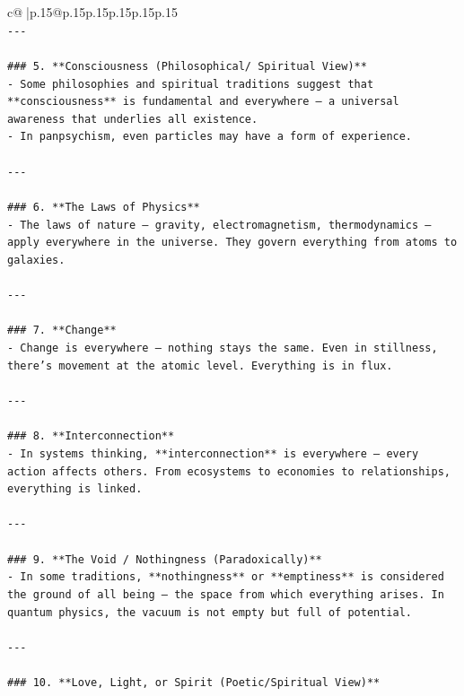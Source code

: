 \documentclass{article}
\begin{document}
{\begin{supertabular}{c@{$\;$}|p{.15\linewidth}@{}p{.15\linewidth}p{.15\linewidth}p{.15\linewidth}p{.15\linewidth}p{.15\linewidth}}
{{{\\ 
\texttt{{-}{-}{-}} \\
\\ 
\texttt{\#\#\# 5. **Consciousness (Philosophical/ Spiritual View)**} \\
\texttt{{-} Some philosophies and spiritual traditions suggest that **consciousness** is fundamental and everywhere — a universal awareness that underlies all existence.} \\
\texttt{{-} In panpsychism, even particles may have a form of experience.} \\
\\ 
\texttt{{-}{-}{-}} \\
\\ 
\texttt{\#\#\# 6. **The Laws of Physics**} \\
\texttt{{-} The laws of nature — gravity, electromagnetism, thermodynamics — apply everywhere in the universe. They govern everything from atoms to galaxies.} \\
\\ 
\texttt{{-}{-}{-}} \\
\\ 
\texttt{\#\#\# 7. **Change**} \\
\texttt{{-} Change is everywhere — nothing stays the same. Even in stillness, there’s movement at the atomic level. Everything is in flux.} \\
\\ 
\texttt{{-}{-}{-}} \\
\\ 
\texttt{\#\#\# 8. **Interconnection**} \\
\texttt{{-} In systems thinking, **interconnection** is everywhere — every action affects others. From ecosystems to economies to relationships, everything is linked.} \\
\\ 
\texttt{{-}{-}{-}} \\
\\ 
\texttt{\#\#\# 9. **The Void / Nothingness (Paradoxically)**} \\
\texttt{{-} In some traditions, **nothingness** or **emptiness** is considered the ground of all being — the space from which everything arises. In quantum physics, the vacuum is not empty but full of potential.} \\
\\ 
\texttt{{-}{-}{-}} \\
\\ 
\texttt{\#\#\# 10. **Love, Light, or Spirit (Poetic/Spiritual View)**} \\
}}}
\end{supertabular}}
\end{document}
